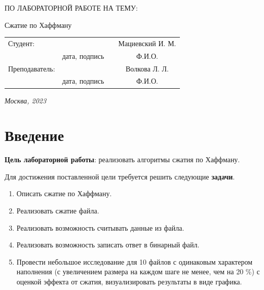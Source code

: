 \documentclass[12pt, a4paper]{article}
\begin{document}
\begin{titlepage}
\begin{center}
\begin{bf}
    \fontsize{20}{30}\selectfont
    ПО ЛАБОРАТОРНОЙ РАБОТЕ НА ТЕМУ:

    Сжатие по Хаффману

   \end{bf}
  \end{center}

  \fontsize{14}{21}\selectfont
  \vspace{5cm}


  \noindent\begin{tabularx}{\textwidth}{ X >{\centering}p{4cm} p{1cm} c }
   Студент: & & & Мациевский И. М. \\ \cline{2-2} \cline{4-4}
   & \fontsize{10}{15}\selectfont дата, подпись & & \fontsize{10}{15}\selectfont Ф.И.О. \\
   Преподаватель: & & & Волкова Л. Л.\\ \cline{2-2} \cline{4-4}
   & \fontsize{10}{15}\selectfont дата, подпись & & \fontsize{10}{15}\selectfont Ф.И.О.
   \end{tabularx}

  \vspace{\fill}

  \begin{center}
   \it{Москва}, 2023
  \end{center}

  \thispagestyle{empty}
\end{titlepage}\newpage
\tableofcontents
\newpage
\section*{Введение}
\textbf{Цель лабораторной работы}: реализовать алгоритмы сжатия по Хаффману.

Для достижения поставленной цели требуется решить следующие \textbf{задачи}.
\begin{enumerate}
\item Описать сжатие по Хаффману.
\item Реализовать сжатие файла.
\item Реализовать возможность считывать данные из 
файла.
\item Реализовать возможность записать ответ в 
бинарный файл.
\item Провести небольшое исследование для 10 файлов с одинаковым характером 
наполнения (с увеличением размера на каждом шаге не менее, чем на 20 \%) с 
оценкой эффекта от сжатия, визуализировать результаты в виде графика.

\end{enumerate}
\end{document}
